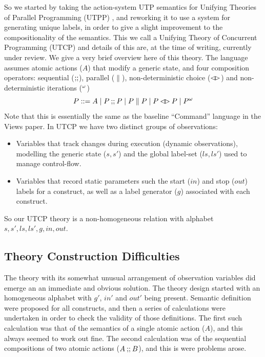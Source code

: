 So we started by taking the action-system UTP semantics for Unifying Theories
of Parallel Programming (UTPP) \cite{DBLP:conf/icfem/WoodcockH02},
and reworking it to use a system for generating unique labels,
in order to give a slight improvement to the compositionality
of the semantics. This we call a Unifying Theory of Concurrent Programming
(UTCP) and details of this are,
at the time of writing,
currently under review\cite{conf/tase/BMN165}.
We give a very brief overview here of this theory.
The language assumes atomic actions ($A$) that modify a generic state,
and four composition operators: sequential ($\mathrel{\mathbf{;\!;}}$), parallel ($\parallel$),
non-deterministic choice ($\mathbin{\lhd\!\rhd}$) and non-deterministic iterations (${}^{\omega}$)
\[
   P ::= A \mid P \mathbin{\mathbf{;\!;}} P \mid P \parallel P \mid P \mathbin{\lhd\!\rhd} P \mid {P}^{\omega}
\]
Note that this is essentially the same as the baseline ``Command'' language
in the Views paper\cite{conf/popl/Dinsdale-YoungBGPY13}.
In UTCP we have two distinct groups of observations:
\begin{itemize}
  \item
    Variables that track changes during execution
    (dynamic observations),
    modelling the generic state ($s,s'$)
    and the global label-set ($ls,ls'$) used to manage control-flow.
  \item
    Variables that record static parameters such the start ($in$)
    and stop ($out$) labels for a construct,
    as well as a label generator ($g$) associated with each construct.
\end{itemize}
So our UTCP theory is a non-homogeneous relation with alphabet $s,s',ls,ls',g,in,out$.


\subsection{Theory Construction Difficulties}

The theory with its somewhat unusual arrangement of observation variables
did emerge an an immediate and obvious solution.
The theory design started with an homogeneous alphabet with $g'$, $in'$ and $out'$
being present. Semantic definition were proposed for all constructs,
and then a series of calculations were undertaken in order to check
the validity of those definitions.
The first such calculation was that of the semantics of a single atomic
action ($A$), and this always seemed to work out fine.
The second calculation was of the sequential compositions of two atomic
actions ($A\mathbin{\mathbf{;\!;}} B$), and this is were problems arose.

